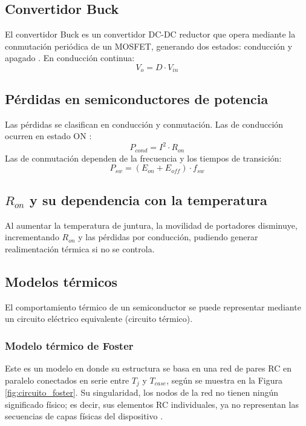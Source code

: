\documentclass[journal]{IEEEtran}
\begin{document}
\subsection{Convertidor Buck}
El convertidor Buck es un convertidor DC-DC reductor que opera mediante la conmutación periódica de un MOSFET, generando dos estados: conducción y apagado \cite{hart2011power}. En conducción continua:
\begin{equation}
    V_o = D \cdot V_{in}
\end{equation}

\subsection{Pérdidas en semiconductores de potencia}
Las pérdidas se clasifican en conducción y conmutación. Las de conducción ocurren en estado ON \cite{kassakian1991principles}:
\begin{equation}
    P_{cond} = I^2 \cdot R_{on}
\end{equation}
Las de conmutación dependen de la frecuencia y los tiempos de transición:
\begin{equation}
    P_{sw} = (E_{on} + E_{off}) \cdot f_{sw} 
\end{equation}

\subsection{$R_{on}$ y su dependencia con la temperatura}
Al aumentar la temperatura de juntura, la movilidad de portadores disminuye, incrementando $R_{on}$ y las pérdidas por conducción, pudiendo generar realimentación térmica si no se controla.
\subsection{Modelos térmicos}
    El comportamiento térmico de un semiconductor se puede representar
    mediante un circuito eléctrico equivalente (circuito térmico).

    \setlength{\parskip}{1em}

    \subsubsection{Modelo térmico de Foster}
    Este es un modelo en donde su estructura se basa en una red de pares RC
    en paralelo conectados en serie entre \emph{$T_{j}$} y \emph{$T_{case}$}, según se muestra en la Figura \ref{fig:circuito_foster}. 
    Su singularidad, los nodos de la red no tienen ningún significado físico; es decir, sus elementos RC individuales, 
    ya no representan las secuencias de capas físicas del dispositivo \cite{schutze2008thermal}.
\end{document}
